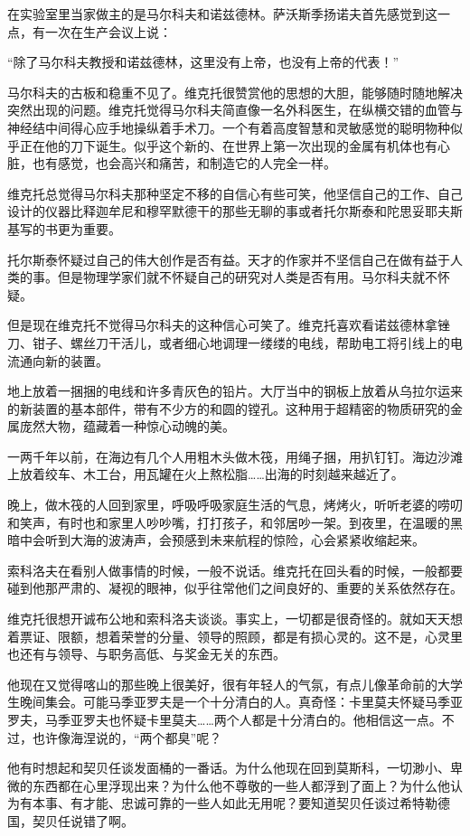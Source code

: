 在实验室里当家做主的是马尔科夫和诺兹德林。萨沃斯季扬诺夫首先感觉到这一点，有一次在生产会议上说：

“除了马尔科夫教授和诺兹德林，这里没有上帝，也没有上帝的代表！”

马尔科夫的古板和稳重不见了。维克托很赞赏他的思想的大胆，能够随时随地解决突然出现的问题。维克托觉得马尔科夫简直像一名外科医生，在纵横交错的血管与神经结中间得心应手地操纵着手术刀。一个有着高度智慧和灵敏感觉的聪明物种似乎正在他的刀下诞生。似乎这个新的、在世界上第一次出现的金属有机体也有心脏，也有感觉，也会高兴和痛苦，和制造它的人完全一样。

维克托总觉得马尔科夫那种坚定不移的自信心有些可笑，他坚信自己的工作、自己设计的仪器比释迦牟尼和穆罕默德干的那些无聊的事或者托尔斯泰和陀思妥耶夫斯基写的书更为重要。

托尔斯泰怀疑过自己的伟大创作是否有益。天才的作家并不坚信自己在做有益于人类的事。但是物理学家们就不怀疑自己的研究对人类是否有用。马尔科夫就不怀疑。

但是现在维克托不觉得马尔科夫的这种信心可笑了。维克托喜欢看诺兹德林拿锉刀、钳子、螺丝刀干活儿，或者细心地调理一缕缕的电线，帮助电工将引线上的电流通向新的装置。

地上放着一捆捆的电线和许多青灰色的铅片。大厅当中的钢板上放着从乌拉尔运来的新装置的基本部件，带有不少方的和圆的镗孔。这种用于超精密的物质研究的金属庞然大物，蕴藏着一种惊心动魄的美。

一两千年以前，在海边有几个人用粗木头做木筏，用绳子捆，用扒钉钉。海边沙滩上放着绞车、木工台，用瓦罐在火上熬松脂……出海的时刻越来越近了。

晚上，做木筏的人回到家里，呼吸呼吸家庭生活的气息，烤烤火，听听老婆的唠叨和笑声，有时也和家里人吵吵嘴，打打孩子，和邻居吵一架。到夜里，在温暖的黑暗中会听到大海的波涛声，会预感到未来航程的惊险，心会紧紧收缩起来。

索科洛夫在看别人做事情的时候，一般不说话。维克托在回头看的时候，一般都要碰到他那严肃的、凝视的眼神，似乎往常他们之间良好的、重要的关系依然存在。

维克托很想开诚布公地和索科洛夫谈谈。事实上，一切都是很奇怪的。就如天天想着票证、限额，想着荣誉的分量、领导的照顾，都是有损心灵的。这不是，心灵里也还有与领导、与职务高低、与奖金无关的东西。

他现在又觉得喀山的那些晚上很美好，很有年轻人的气氛，有点儿像革命前的大学生晚间集会。可能马季亚罗夫是一个十分清白的人。真奇怪：卡里莫夫怀疑马季亚罗夫，马季亚罗夫也怀疑卡里莫夫……两个人都是十分清白的。他相信这一点。不过，也许像海涅说的，“两个都臭”呢？

他有时想起和契贝任谈发面桶的一番话。为什么他现在回到莫斯科，一切渺小、卑微的东西都在心里浮现出来？为什么他不尊敬的一些人都浮到了面上？为什么他认为有本事、有才能、忠诚可靠的一些人如此无用呢？要知道契贝任谈过希特勒德国，契贝任说错了啊。

